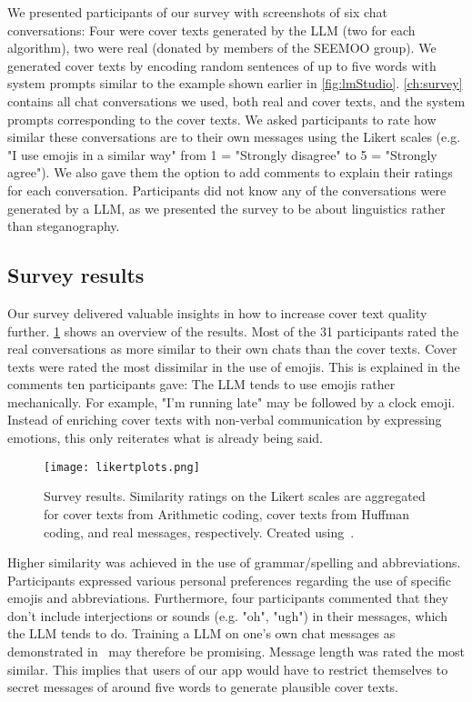 We presented participants of our survey with screenshots of six chat conversations: Four were cover texts generated by the \gls{LLM} (two for each algorithm), two were real (donated by members of the SEEMOO group). We generated cover texts by encoding random sentences of up to five words with system prompts similar to the example shown earlier in \cref{fig:lmStudio}. \cref{ch:survey} contains all chat conversations we used, both real and cover texts, and the system prompts corresponding to the cover texts. We asked participants to rate how similar these conversations are to their own messages using the Likert scales (e.g. "I use emojis in a similar way" from 1 = "Strongly disagree" to 5 = "Strongly agree"). We also gave them the option to add comments to explain their ratings for each conversation. Participants did not know any of the conversations were generated by a \gls{LLM}, as we presented the survey to be about linguistics rather than steganography.

\subsection{Survey results}
\label{sec:surveyResults}
Our survey delivered valuable insights in how to increase cover text quality further. \cref{fig:likertplots} shows an overview of the results. Most of the 31 participants rated the real conversations as more similar to their own chats than the cover texts. Cover texts were rated the most dissimilar in the use of emojis. This is explained in the comments ten participants gave: The \gls{LLM} tends to use emojis rather mechanically. For example, "I'm running late" may be followed by a clock emoji. Instead of enriching cover texts with non-verbal communication by expressing emotions, this only reiterates what is already being said.

\begin{figure}
	\centering
	\captionsetup{width=\linewidth}
	\texttt{[image: likertplots.png]}
	\caption[Survey: Results]{Survey results. Similarity ratings on the Likert scales are aggregated for cover texts from Arithmetic coding, cover texts from Huffman coding, and real messages, respectively. Created using~\cite{maurerLikertplotcomPlotLikert2013}.}
	\label{fig:likertplots}
\end{figure}

Higher similarity was achieved in the use of grammar/spelling and abbreviations. Participants expressed various personal preferences regarding the use of specific emojis and abbreviations. Furthermore, four participants commented that they don't include interjections or sounds (e.g. "oh", "ugh") in their messages, which the \gls{LLM} tends to do. Training a \gls{LLM} on one's own chat messages as demonstrated in~\cite{donnerSimulationMeFinetuning2024} may therefore be promising. Message length was rated the most similar. This implies that users of our app would have to restrict themselves to secret messages of around five words to generate plausible cover texts.


